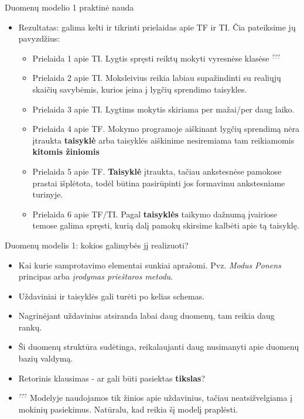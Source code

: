 \documentclass[xcolor={dvipsnames}]{beamer}
\begin{document}
\begin{frame}[fragile]{Duomenų modelio 1 praktinė nauda}
\begin{itemize}
\item<1-> Rezultatas: galima kelti ir tikrinti prielaidas apie TF ir TI. Čia pateiksime jų pavyzdžius:
 \begin{itemize}
	\item Prielaida 1 apie TI. Lygtis spręsti reiktų mokyti vyresnėse klasėse $^{???}$
	\item Prielaida 2 apie TI. Moksleivius reikia labiau supažindinti su realiųjų skaičių savybėmis, kurios įeina į lygčių sprendimo taisykles.
	\item Prielaida 3 apie TI. Lygtims mokytis skiriama per mažai/per daug laiko.
	\item Prielaida 4 apie TF. Mokymo programoje aiškinant lygčių sprendimą nėra įtraukta \textbf{taisyklė} arba taisyklės aiškinime nesiremiama tam reikiamomis \textbf{kitomis žiniomis}
	\item Prielaida 5 apie TF. \textbf{Taisyklė} įtraukta, tačiau ankstesnėse pamokose prastai išplėtota, todėl būtina pasirūpinti jos formavimu ankstesniame turinyje.
	\item Prielaida 6 apie TF/TI. Pagal \textbf{taisyklės} taikymo dažnumą įvairiose temose galima spręsti, kurią dalį pamokų skirsime kalbėti apie tą taisyklę.
\end{itemize}
\end{itemize}
\end{frame}

\begin{frame}[fragile]{Duomenų modelis 1: kokios galimybės jį realizuoti?}
\begin{itemize}
\item<1-> Kai kurie samprotavimo elementai sunkiai aprašomi. Pvz. \textit{Modus Ponens} principas arba \textit{įrodymas prieštaros metodu}.
\item<2-> Uždaviniai ir taisyklės gali turėti po kelias schemas.
\item<3-> Nagrinėjant uždavinius atsiranda labai daug duomenų, tam reikia daug rankų.
\item<4-> Ši duomenų struktūra sudėtinga, reikalaujanti daug nusimanyti apie duomenų bazių valdymą.
\item<5-> Retorinis klausimas - ar gali būti pasiektas \textbf{tikslas}?
\item<6-> $^{???}$ Modelyje naudojamos tik žinios apie uždavinius, tačiau neatsižvelgiama į mokinių pasiekimus. Natūralu, kad reikia šį modelį praplėsti.
\end{itemize}
\end{frame}
\end{document}
